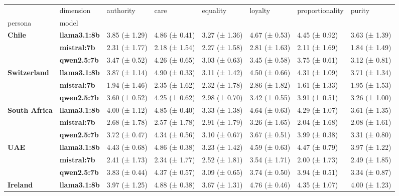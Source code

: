 \begin{tabular}{llllllll}
\toprule
 & dimension & authority & care & equality & loyalty & proportionality & purity \\
persona & model &  &  &  &  &  &  \\
\midrule
\multirow[t]{3}{*}{\textbf{Chile}} & \textbf{llama3.1:8b} & 3.85 (± 1.29) & 4.86 (± 0.41) & 3.27 (± 1.36) & 4.67 (± 0.53) & 4.45 (± 0.92) & 3.63 (± 1.39) \\
\textbf{} & \textbf{mistral:7b} & 2.31 (± 1.77) & 2.18 (± 1.54) & 2.27 (± 1.58) & 2.81 (± 1.63) & 2.11 (± 1.69) & 1.84 (± 1.49) \\
\textbf{} & \textbf{qwen2.5:7b} & 3.47 (± 0.52) & 4.26 (± 0.65) & 3.03 (± 0.63) & 3.45 (± 0.58) & 3.75 (± 0.61) & 3.12 (± 0.81) \\
\cline{1-8}
\multirow[t]{3}{*}{\textbf{Switzerland}} & \textbf{llama3.1:8b} & 3.87 (± 1.14) & 4.90 (± 0.33) & 3.11 (± 1.42) & 4.50 (± 0.66) & 4.31 (± 1.09) & 3.71 (± 1.34) \\
\textbf{} & \textbf{mistral:7b} & 1.94 (± 1.46) & 2.35 (± 1.62) & 2.32 (± 1.78) & 2.86 (± 1.82) & 1.61 (± 1.33) & 1.95 (± 1.53) \\
\textbf{} & \textbf{qwen2.5:7b} & 3.60 (± 0.52) & 4.25 (± 0.62) & 2.98 (± 0.70) & 3.42 (± 0.55) & 3.91 (± 0.51) & 3.26 (± 1.00) \\
\cline{1-8}
\multirow[t]{3}{*}{\textbf{South Africa}} & \textbf{llama3.1:8b} & 4.00 (± 1.12) & 4.85 (± 0.40) & 3.33 (± 1.38) & 4.64 (± 0.63) & 4.29 (± 1.07) & 3.61 (± 1.35) \\
\textbf{} & \textbf{mistral:7b} & 2.68 (± 1.78) & 2.57 (± 1.78) & 2.91 (± 1.79) & 3.26 (± 1.65) & 2.04 (± 1.68) & 2.08 (± 1.61) \\
\textbf{} & \textbf{qwen2.5:7b} & 3.72 (± 0.47) & 4.34 (± 0.56) & 3.10 (± 0.67) & 3.67 (± 0.51) & 3.99 (± 0.38) & 3.31 (± 0.80) \\
\cline{1-8}
\multirow[t]{3}{*}{\textbf{UAE}} & \textbf{llama3.1:8b} & 4.43 (± 0.68) & 4.86 (± 0.38) & 3.23 (± 1.42) & 4.59 (± 0.63) & 4.47 (± 0.79) & 3.97 (± 1.22) \\
\textbf{} & \textbf{mistral:7b} & 2.41 (± 1.73) & 2.34 (± 1.77) & 2.52 (± 1.81) & 3.54 (± 1.71) & 2.00 (± 1.73) & 2.49 (± 1.85) \\
\textbf{} & \textbf{qwen2.5:7b} & 3.83 (± 0.44) & 4.37 (± 0.57) & 3.09 (± 0.65) & 3.74 (± 0.50) & 3.94 (± 0.51) & 3.34 (± 0.87) \\
\cline{1-8}
\multirow[t]{3}{*}{\textbf{Ireland}} & \textbf{llama3.1:8b} & 3.97 (± 1.25) & 4.88 (± 0.38) & 3.67 (± 1.31) & 4.76 (± 0.46) & 4.35 (± 1.07) & 4.00 (± 1.23) \\

\end{tabular}
